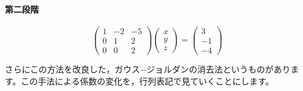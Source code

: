 \documentclass{ltjsbook}
\begin{document}
\paragraph{第二段階}

\[
    \begin{pmatrix} 1 & -2 & -5 \\
                0 & 1  & 2  \\
                0 & 0  & 2\end{pmatrix}
    \begin{pmatrix} x \\ y \\ z \end{pmatrix}
    =
    \begin{pmatrix} 3 \\ -1 \\ -4 \end{pmatrix}
\]

さらにこの方法を改良した，ガウス−ジョルダンの消去法というものがあります。この手法による係数の変化を，行列表記で見ていくことにします。
\end{document}
